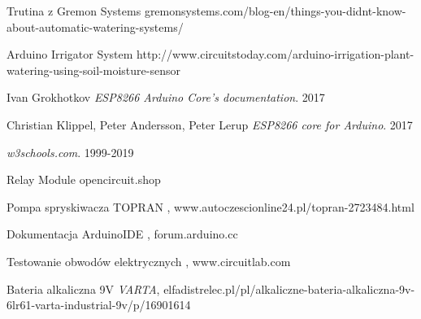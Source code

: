 \documentclass[12pt]{article}
\begin{document}
\newpage
\begin{thebibliography}{9}



 Trutina z Gremon Systems
gremonsystems.com/blog-en/things-you-didnt-know-about-automatic-watering-systems/

 Arduino Irrigator System
http://www.circuitstoday.com/arduino-irrigation-plant-watering-using-soil-moisture-sensor



Ivan Grokhotkov
\textit{ESP8266 Arduino Core’s documentation}. 
2017

Christian Klippel, Peter Andersson, Peter Lerup
\textit{ESP8266 core for Arduino}. 
2017


\textit{w3schools.com}. 
1999-2019
 
 Relay Module
\emph{}
opencircuit.shop

 Pompa spryskiwacza TOPRAN
\emph{},
www.autoczescionline24.pl/topran-2723484.html

 Dokumentacja ArduinoIDE 
\emph{},
forum.arduino.cc

 Testowanie obwodów elektrycznych 
\emph{},
www.circuitlab.com

 Bateria alkaliczna 9V 
\emph{VARTA},
elfadistrelec.pl/pl/alkaliczne-bateria-alkaliczna-9v-6lr61-varta-industrial-9v/p/16901614




\end{thebibliography}
\end{document}
